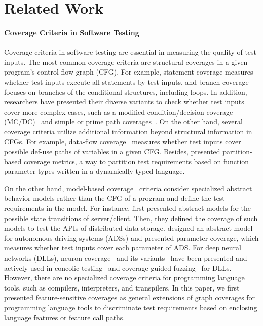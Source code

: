 \section{Related Work}\label{sec:related}

\paragraph{\textbf{Coverage Criteria in Software Testing}}
%
Coverage criteria in software testing are essential in measuring the quality of
test inputs.
%
The most common coverage criteria are structural coverages in a given program's
control-flow graph (CFG).
%
For example, statement coverage measures whether test inputs execute all
statements by test inputs, and branch coverage focuses on branches of the
conditional structures, including loops.
%
In addition, researchers have presented their diverse variants to check whether
test inputs cover more complex cases, such as a modified condition/decision
coverage (MC/DC)~\cite{cov-mcdc} and simple or prime path
coverages~\cite{cov-def}.
%
On the other hand, several coverage criteria utilize additional information
beyond structural information in CFGs.
%
For example, data-flow coverage~\cite{cov-dataflow} measures whether test inputs
cover possible def-use paths of variables in a given CFG.
%
Besides, \citet{cov-partition} presented partition-based coverage metrics, a way
to partition test requirements based on function parameter types written in a
dynamically-typed language.


On the other hand, model-based coverage~\cite{cov-model-book} criteria consider
specialized abstract behavior models rather than the CFG of a program and
define the test requirements in the model.
%
For instance, \citet{cov-model-api} first presented abstract models for the
possible state transitions of server/client.
%
Then, they defined the coverage of such models to test the APIs of distributed
data storage.
%
\citet{cov-param} designed an abstract model for autonomous driving systems
(ADSs) and presented parameter coverage, which measures whether test inputs
cover each parameter of ADS.
%
For deep neural networks (DLLs), neuron coverage~\cite{cov-neuron} and its
variants~\cite{cov-k-neuron} have been presented and actively used in concolic
testing~\cite{cov-concolic-dll} and coverage-guided
fuzzing~\cite{cov-fuzz-tensor, cov-fuzz-dl} for DLLs.
%
However, there are no specialized coverage criteria for programming language
tools, such as compilers, interpreters, and transpilers.
%
In this paper, we first presented feature-sensitive coverages as general
extensions of graph coverages for programming language tools to discriminate
test requirements based on enclosing language features or feature call paths.


